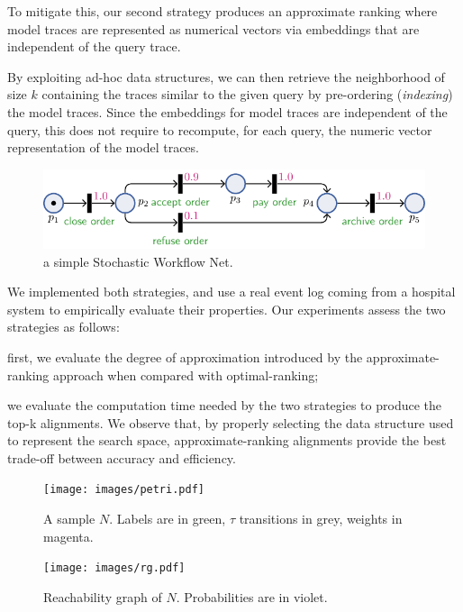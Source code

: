To mitigate this, our second strategy produces an approximate ranking where model traces are represented as numerical vectors via embeddings that are independent of the query trace. {By exploiting ad-hoc data structures,
	we can then retrieve the neighborhood of size $k$ containing the traces similar to the given query by pre-ordering (\textit{indexing}) the model traces.
	Since the embeddings for model traces are independent of the query, this does not require to recompute, for each query, the numeric vector representation of the model traces.
	\begin{figure}[!t]
	\centering
	\includegraphics[width=.49\textwidth]{images/petri_tut.pdf}
	\caption{a simple Stochastic Workflow Net.}\label{fig:petri_tut}
\end{figure}
	

We implemented both strategies, and use  a real event log coming from a hospital system to empirically evaluate their properties. Our experiments assess the two strategies as follows:
\begin{mylist}
	\item first, we evaluate the degree of approximation introduced by the approximate-ranking approach when compared with optimal-ranking;
	\item we evaluate the computation time needed by the two strategies to produce the top-k alignments. 
We observe that, by properly selecting the data structure used to represent the search space, approximate-ranking alignments provide the best trade-off between accuracy and efficiency.
\end{mylist}

\begin{figure}[!t]
	\begin{minipage}{.49\textwidth}
		\centering
		\texttt{[image: images/petri.pdf]}
		\caption{A sample \uswn $N$. Labels are in green, $\tau$ transitions in grey, weights in magenta.}\label{fig:spn}
	\end{minipage}\hfill \begin{minipage}{.49\textwidth}
	\centering
		\texttt{[image: images/rg.pdf]}
		\caption{Reachability graph of $N$. Probabilities are  in violet.}\label{fig:rg}
	\end{minipage}


\end{figure}}
